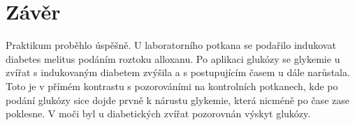\documentclass[12pt]{article}
\begin{document}
\clearpage
\section{Závěr}
Praktikum proběhlo úspěšně. U laboratorního potkana se podařilo indukovat diabetes melitus podáním roztoku alloxanu. Po aplikaci glukózy se glykemie u zvířat s indukovaným diabetem zvýšila a s postupujícím časem u dále narůstala. Toto je v přímém kontrastu s pozorováními na kontrolních potkanech, kde po podání glukózy sice dojde prvně k nárustu glykemie, která nicméně po čase zase poklesne. V moči byl u diabetických zvířat pozorovnán výskyt glukózy.
\end{document}
